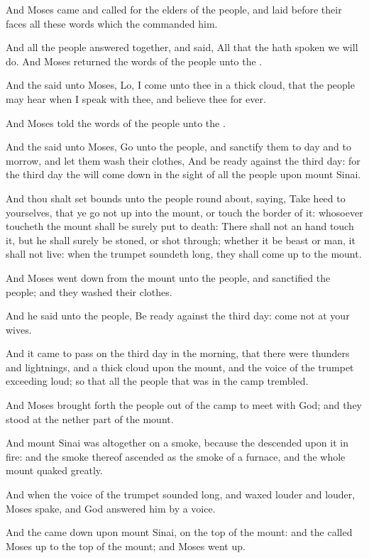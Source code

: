 \verse And Moses came and called for the elders of the people, and laid
before their faces all these words which the \LORD commanded him.

\verse And all the people answered together, and said, All that the \LORD
hath spoken we will do. And Moses returned the words of the people
unto the \LORD.

\verse And the \LORD said unto Moses, Lo, I come unto thee in a thick
cloud, that the people may hear when I speak with thee, and believe
thee for ever.

And Moses told the words of the people unto the \LORD.

\verse And the \LORD said unto Moses, Go unto the people, and sanctify
them to day and to morrow, and let them wash their clothes, \verse And
be ready against the third day: for the third day the \LORD will come
down in the sight of all the people upon mount Sinai.

\verse And thou shalt set bounds unto the people round about, saying,
Take heed to yourselves, that ye go not up into the mount, or touch
the border of it: whosoever toucheth the mount shall be surely put to
death: \verse There shall not an hand touch it, but he shall surely be
stoned, or shot through; whether it be beast or man, it shall not
live: when the trumpet soundeth long, they shall come up to the mount.

\verse And Moses went down from the mount unto the people, and
sanctified the people; and they washed their clothes.

\verse And he said unto the people, Be ready against the third day:
come not at your wives.

\verse And it came to pass on the third day in the morning, that there
were thunders and lightnings, and a thick cloud upon the mount, and
the voice of the trumpet exceeding loud; so that all the people that
was in the camp trembled.

\verse And Moses brought forth the people out of the camp to meet with
God; and they stood at the nether part of the mount.

\verse And mount Sinai was altogether on a smoke, because the \LORD
descended upon it in fire: and the smoke thereof ascended as the smoke
of a furnace, and the whole mount quaked greatly.

\verse And when the voice of the trumpet sounded long, and waxed louder
and louder, Moses spake, and God answered him by a voice.

\verse And the \LORD came down upon mount Sinai, on the top of the
mount: and the \LORD called Moses up to the top of the mount; and Moses
went up.

